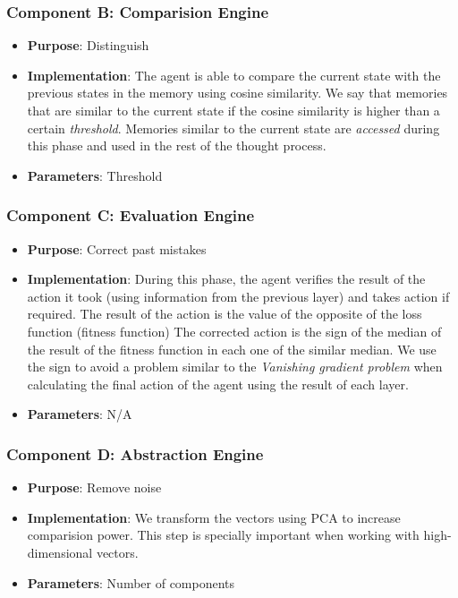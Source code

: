 \documentclass[12pt]{article}
\begin{document}
\subsubsection{Component B: Comparision Engine}
\begin{itemize}
    \item \textbf{Purpose}: Distinguish
    \item \textbf{Implementation}:
        The agent is able to compare the current state with the previous states in the memory
        using cosine similarity.
        We say that memories that are similar to the current state if the cosine similarity is
        higher than a certain \emph{threshold}.
        Memories similar to the current state are \emph{accessed} during this phase and used
        in the rest of the thought process.
\item \textbf{Parameters}: Threshold
\end{itemize}

\subsubsection{Component C: Evaluation Engine}
\begin{itemize}
    \item \textbf{Purpose}: Correct past mistakes
    \item \textbf{Implementation}:
        During this phase, the agent verifies the result of the action it took (using information from the previous layer)
        and takes action if required. The result of the action is the value of the opposite of the loss function (fitness function)
        The corrected action is the sign of the median of the result of the fitness function in each one of the similar median.
        We use the sign to avoid a problem similar to the \emph{Vanishing gradient problem} when calculating the final action of
        the agent using the result of each layer.
\item \textbf{Parameters}: N/A
\end{itemize}

\subsubsection{Component D: Abstraction Engine}
\begin{itemize}
    \item \textbf{Purpose}: Remove noise
    \item \textbf{Implementation}:
        We transform the vectors using PCA to increase comparision power.
        This step is specially important when working with high-dimensional vectors.
    \item \textbf{Parameters}: Number of components
\end{itemize}
\end{document}
